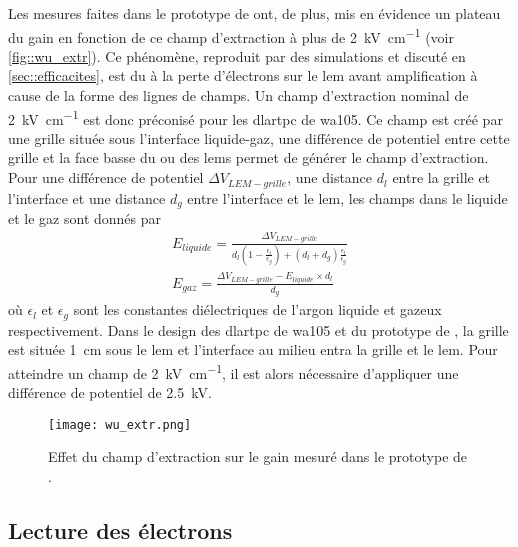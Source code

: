      Les mesures faites dans le prototype de \threeL{} ont, de plus, mis en évidence un plateau du gain en fonction de ce champ d'extraction à plus de \SI{2}{\kilo\volt\per\centi\meter} (voir \autoref{fig::wu_extr}). Ce phénomène, reproduit par des simulations et discuté en \autoref{sec::efficacites}, est du à la perte d'électrons sur le \gls{lem} avant amplification à cause de la forme des lignes de champs. Un champ d'extraction nominal de \SI{2}{\kilo\volt\per\centi\meter} est donc préconisé pour les \gls{dlartpc} de \gls{wa105}. Ce champ est créé par une grille située sous l'interface liquide-gaz, une différence de potentiel entre cette grille et la face basse du ou des \glspl{lem} permet de générer le champ d'extraction. Pour une différence de potentiel $\Delta V_{LEM-grille}$, une distance $d_l$ entre la grille et l'interface et une distance $d_g$ entre l'interface et le \gls{lem}, les champs dans le liquide et le gaz sont donnés par
      \begin{eqnarray}\label{eq::fields_liquid_gas}
          E_{liquide} = \frac{\Delta V_{LEM-grille}}{d_l(1-\frac{\epsilon_l}{\epsilon_g}) + (d_l+d_g)\frac{\epsilon_l}{\epsilon_g}} \\ 
          E_{gaz} = \frac{\Delta V_{LEM-grille} - E_{liquide} \times d_l}{d_g}
        \end{eqnarray}
      où $\epsilon_l$ et $\epsilon_g$ sont les constantes diélectriques de l'argon liquide et gazeux respectivement. Dans le design des \gls{dlartpc} de \gls{wa105} et du prototype de \threeL{}, la grille est située \SI{1}{\centi\meter} sous le \gls{lem} et l'interface au milieu entra la grille et le \gls{lem}. Pour atteindre un champ de \SI{2}{\kilo\volt\per\centi\meter}, il est alors nécessaire d'appliquer une différence de potentiel de \SI{2.5}{\kilo\volt}.

      \begin{figure}[htbp]
        \centering
        \texttt{[image: wu\_extr.png]}
        \caption[Effet du champ d'extraction sur le gain mesuré dans le prototype de \threeL{}.]{\label{fig::wu_extr}Effet du champ d'extraction sur le gain mesuré dans le prototype de \threeL{}\cite{Wu2017}.}
      \end{figure}

    \subsection{Lecture des électrons}\label{sec::induction}
    
